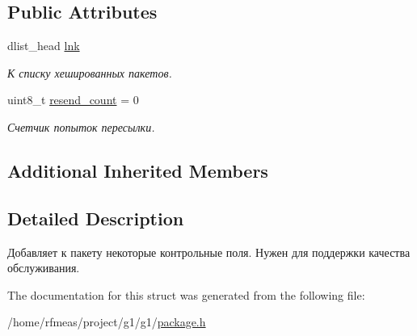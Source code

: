 \subsection*{Public Attributes}
\begin{DoxyCompactItemize}
\item 
dlist\+\_\+head \hyperlink{structg1_1_1controlled__package_aa9b5b38084ebcc0190d7fc05a62da482}{lnk}\hypertarget{structg1_1_1controlled__package_aa9b5b38084ebcc0190d7fc05a62da482}{}\label{structg1_1_1controlled__package_aa9b5b38084ebcc0190d7fc05a62da482}

\begin{DoxyCompactList}\small\item\em К списку хешированных пакетов. \end{DoxyCompactList}\item 
uint8\+\_\+t \hyperlink{structg1_1_1controlled__package_add10af1315e574984ceaed5fff274394}{resend\+\_\+count} = 0\hypertarget{structg1_1_1controlled__package_add10af1315e574984ceaed5fff274394}{}\label{structg1_1_1controlled__package_add10af1315e574984ceaed5fff274394}

\begin{DoxyCompactList}\small\item\em Счетчик попыток пересылки. \end{DoxyCompactList}\end{DoxyCompactItemize}
\subsection*{Additional Inherited Members}


\subsection{Detailed Description}
Добавляет к пакету некоторые контрольные поля. Нужен для поддержки качества обслуживания. 

The documentation for this struct was generated from the following file\+:\begin{DoxyCompactItemize}
\item 
/home/rfmeas/project/g1/g1/\hyperlink{package_8h}{package.\+h}\end{DoxyCompactItemize}
